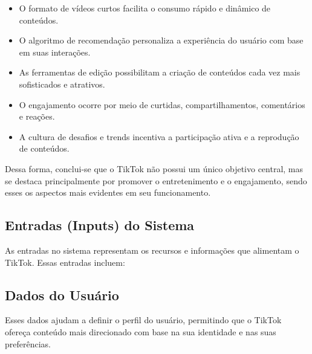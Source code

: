 \begin{itemize}
    \item O formato de vídeos curtos facilita o consumo rápido e dinâmico de conteúdos.
    \item O algoritmo de recomendação personaliza a experiência do usuário com base em suas interações.
    \item As ferramentas de edição possibilitam a criação de conteúdos cada vez mais sofisticados e atrativos.
    \item O engajamento ocorre por meio de curtidas, compartilhamentos, comentários e reações.
     \item A cultura de desafios e trends incentiva a participação ativa e a reprodução de conteúdos.
\end{itemize}


Dessa forma, conclui-se que o TikTok não possui um único objetivo central, mas se destaca principalmente por promover o entretenimento e o engajamento, sendo esses os aspectos mais evidentes em seu funcionamento.

\newpage
\subsection{Entradas (Inputs) do Sistema}

As entradas no sistema representam os recursos e informações que alimentam o TikTok. Essas entradas incluem:


\subsection{Dados do Usuário}

Esses dados ajudam a definir o perfil do usuário, permitindo que o TikTok ofereça conteúdo mais direcionado com base na sua identidade e nas suas preferências. 

